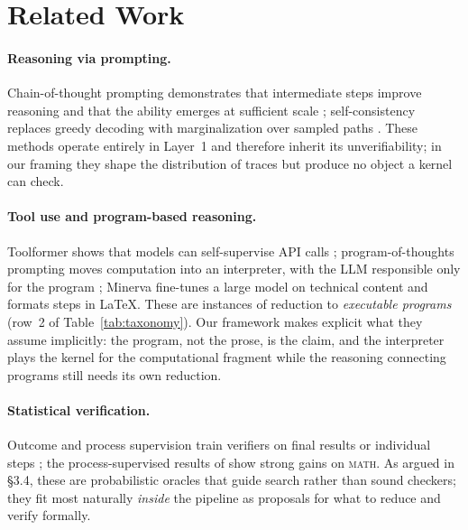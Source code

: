 \documentclass[11pt,a4paper]{article}
\theoremstyle{plain}
\theoremstyle{definition}
\theoremstyle{remark}
\begin{document}
\section{Related Work}\label{sec:related}

\paragraph{Reasoning via prompting.}
Chain-of-thought prompting demonstrates that intermediate steps improve
reasoning and that the ability emerges at sufficient scale
\citep{wei2022cot}; self-consistency replaces greedy decoding with
marginalization over sampled paths \citep{wang2023selfconsistency}. These
methods operate entirely in Layer~1 and therefore inherit its unverifiability;
in our framing they shape the distribution of traces but produce no object
a kernel can check.

\paragraph{Tool use and program-based reasoning.}
Toolformer shows that models can self-supervise API calls
\citep{schick2023toolformer}; program-of-thoughts prompting moves
computation into an interpreter, with the LLM responsible only for the
program \citep{chen2023pot}; Minerva fine-tunes a large model on technical
content and formats steps in \LaTeX \citep{lewkowycz2022minerva}. These are
instances of reduction to \emph{executable programs} (row~2 of
Table~\ref{tab:taxonomy}). Our framework makes explicit what they assume
implicitly: the program, not the prose, is the claim, and the interpreter
plays the kernel for the computational fragment while the reasoning
connecting programs still needs its own reduction.

\paragraph{Statistical verification.}
Outcome and process supervision train verifiers on final results or
individual steps \citep{uesato2022process}; the process-supervised results
of \citet{lightman2024verify} show strong gains on \textsc{math}. As argued
in \S3.4, these are probabilistic oracles that guide search rather than
sound checkers; they fit most naturally \emph{inside} the pipeline as
proposals for what to reduce and verify formally.
\end{document}
